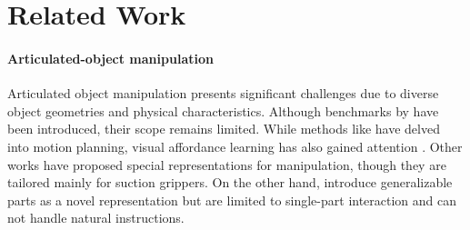\section{Related Work}

\paragraph{Articulated-object manipulation}
Articulated object manipulation presents significant challenges due to diverse object geometries and physical characteristics. Although benchmarks by \citep{urakami2019doorgym, mu2021maniskill} have been introduced, their scope remains limited. While methods like \citep{peterson2000high, jain2009pulling, burget2013whole} have delved into motion planning, visual affordance learning has also gained attention \citep{mo2021where2act, wu2022vatmart, wang2022adaafford, zhao2022dualafford, geng2022end}. 
Other works \citep{eisner2022flowbot3d, xu2022universal} have proposed special representations for manipulation, though they are tailored mainly for suction grippers. 
On the other hand, \citep{geng2022gapartnet, geng2023partmanip} introduce generalizable parts as a novel representation but are limited to single-part interaction and can not handle natural instructions.





